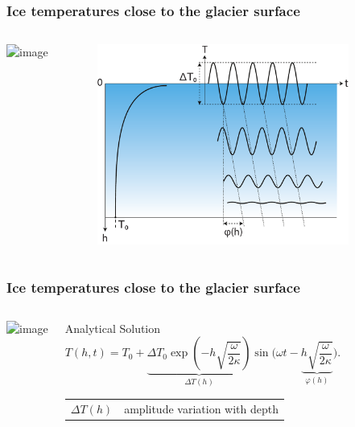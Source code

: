 \documentclass[hide notes,intlimits]{beamer}
\begin{document}
\begin{frame}
  \frametitle{Ice temperatures close to the glacier surface}
  \begin{columns}
    \column[T]{1.75cm} 
    \vspace{1cm}
    {\includegraphics<1>[width=1.5cm]{figures/glaciersv_c}}%
    \vspace{2.5cm}
    \column[T]{10.25cm}
    \begin{figure}
    \includegraphics[width=8.25cm]{figures/temp-attenuation}
   \end{figure}
 \end{columns}  
\end{frame}


\begin{frame}
  \frametitle{Ice temperatures close to the glacier surface}
  \begin{columns}
    \column[T]{1.75cm} 
    \vspace{1cm}
    {\includegraphics<1>[width=1.5cm]{figures/glaciersv_c}}%
    \vspace{2.5cm}
    \column[T]{10.25cm}
    \begin{block}{Analytical Solution}
      \begin{equation*}
        \label{eq:heat-flow-1d-solution}
        T(h,t) = T_0 + \underbrace{\Delta T_0 \exp\left(-h \sqrt{\frac{\omega}{2\kappa}}\right)}_{\Delta T(h)}
        \sin\Big(\omega t - \underbrace{h \sqrt{\frac{\omega}{2\kappa}}}_{\varphi(h)}\Big).
      \end{equation*}
      \begin{tabular}{cl}
        $\Delta T(h)$ & amplitude variation with depth 
      \end{tabular}
    \end{block}
  \end{columns}  
\end{frame}
\end{document}
